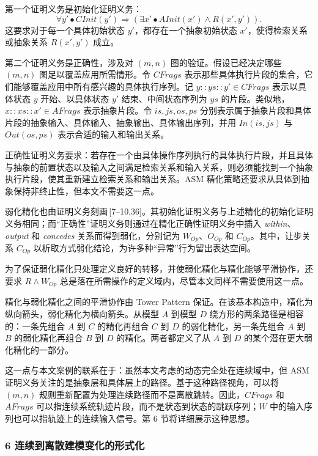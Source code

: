 {\indent 第一个证明义务是初始化证明义务：
\[
\forall y'\bullet CInit(y')\Rightarrow
(\exists x'\bullet AInit(x')\land R(x',y')) .
\]
这要求对于每一个具体初始状态 $y'$，都存在一个抽象初始状态 $x'$，使得检索关系或抽象关系 $R(x',y')$ 成立。

\indent 第二个证明义务是正确性，涉及对 $(m,n)$ 图的验证。假设已经决定哪些 $(m,n)$ 图足以覆盖应用所需情形。令 $CFrags$ 表示那些具体执行片段的集合，它们能够覆盖应用中所有感兴趣的具体执行序列。记 $y::ys::y'\in CFrags$ 表示以具体状态 $y$ 开始、以具体状态 $y'$ 结束、中间状态序列为 $ys$ 的片段。类似地，$x::xs::x'\in AFrags$ 表示抽象片段。令 $is,js,os,ps$ 分别表示属于抽象片段和具体片段的抽象输入、具体输入、抽象输出、具体输出序列，并用 $In(is,js)$ 与 $Out(os,ps)$ 表示合适的输入和输出关系。

\indent 正确性证明义务要求：若存在一个由具体操作序列执行的具体执行片段，并且具体与抽象的前置状态以及输入之间满足检索关系和输入关系，则必须能找到一个抽象执行片段，使其重新建立检索关系和输出关系。ASM 精化策略还要求从具体到抽象保持非终止性，但本文不需要这一点。

\indent 弱化精化也由证明义务刻画\,[7--10,36]。其初始化证明义务与上述精化的初始化证明义务相同；而“正确性”证明义务则通过在精化正确性证明义务中插入 \textit{within}、\textit{output} 和 \textit{concedes} 关系而得到弱化，分别记为 $W_{Op}$、$O_{Op}$ 和 $C_{Op}$。其中，让步关系 $C_{Op}$ 以析取方式弱化结论，为许多种“异常”行为留出表达空间。

\indent 为了保证弱化精化只处理定义良好的转移，并使弱化精化与精化能够平滑协作，还要求 $R\land W_{Op}$ 总是落在所需操作的定义域内，尽管本文同样不需要使用这一点。

\indent 精化与弱化精化之间的平滑协作由 Tower Pattern 保证。在该基本构造中，精化为纵向箭头，弱化精化为横向箭头。从模型 $A$ 到模型 $D$ 绕方形的两条路径是相容的：一条先组合 $A$ 到 $C$ 的精化再组合 $C$ 到 $D$ 的弱化精化，另一条先组合 $A$ 到 $B$ 的弱化精化再组合 $B$ 到 $D$ 的精化。两者都定义了从 $A$ 到 $D$ 的某个潜在更大弱化精化的一部分。

\indent 这一点与本文案例的联系在于：虽然本文考虑的动态完全处在连续域中，但 ASM 证明义务关注的是抽象层和具体层上的路径。基于这种路径视角，可以将 $(m,n)$ 规则重新配置为处理连续路径而不是离散跳转。因此，$CFrags$ 和 $AFrags$ 可以指连续系统轨迹片段，而不是状态到状态的跳跃序列；$W$ 中的输入序列也可以指轨迹上的连续输入信号。第 6 节将详细展示这种思想。

\subsubsection*{6 连续到离散建模变化的形式化}

}
